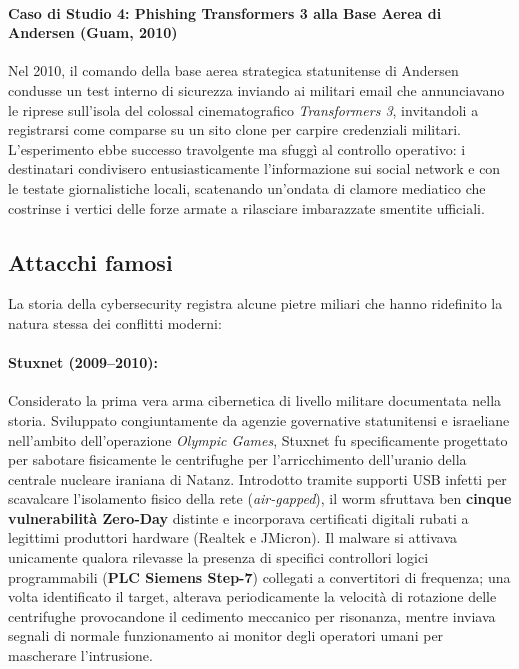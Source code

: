 \documentclass[../../main.tex]{subfiles}
\begin{document}
\paragraph{Caso di Studio 4: Phishing Transformers 3 alla Base Aerea di Andersen (Guam, 2010)}
Nel 2010, il comando della base aerea strategica statunitense di Andersen condusse un test interno di sicurezza inviando ai militari email che annunciavano le riprese sull'isola del colossal cinematografico \textit{Transformers 3}, invitandoli a registrarsi come comparse su un sito clone per carpire credenziali militari. L'esperimento ebbe successo travolgente ma sfuggì al controllo operativo: i destinatari condivisero entusiasticamente l'informazione sui social network e con le testate giornalistiche locali, scatenando un'ondata di clamore mediatico che costrinse i vertici delle forze armate a rilasciare imbarazzate smentite ufficiali.

\subsection{Attacchi famosi}
\label{subsec:attacchi_famosi}

La storia della cybersecurity registra alcune pietre miliari che hanno ridefinito la natura stessa dei conflitti moderni:

\paragraph{Stuxnet (2009--2010):}
Considerato la prima vera arma cibernetica di livello militare documentata nella storia. Sviluppato congiuntamente da agenzie governative statunitensi e israeliane nell'ambito dell'operazione \textit{Olympic Games}, Stuxnet fu specificamente progettato per sabotare fisicamente le centrifughe per l'arricchimento dell'uranio della centrale nucleare iraniana di Natanz. Introdotto tramite supporti USB infetti per scavalcare l'isolamento fisico della rete (\textit{air-gapped}), il worm sfruttava ben \textbf{cinque vulnerabilità Zero-Day} distinte e incorporava certificati digitali rubati a legittimi produttori hardware (Realtek e JMicron). Il malware si attivava unicamente qualora rilevasse la presenza di specifici controllori logici programmabili (\textbf{PLC Siemens Step-7}) collegati a convertitori di frequenza; una volta identificato il target, alterava periodicamente la velocità di rotazione delle centrifughe provocandone il cedimento meccanico per risonanza, mentre inviava segnali di normale funzionamento ai monitor degli operatori umani per mascherare l'intrusione.
\end{document}
